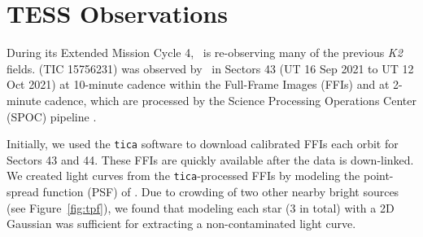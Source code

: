 \documentclass[twocolumn]{aastex631}
\begin{document}
\section{TESS Observations} \label{sec:observations}

During its Extended Mission Cycle 4, \tess\ is re-observing many of the previous \textit{K2} fields. \sname (TIC 15756231) was observed by \tess\ in Sectors 43 (UT 16 Sep 2021 to UT 12 Oct 2021) at 10-minute cadence within the Full-Frame Images (FFIs) and at 2-minute cadence, which are processed by the Science Processing Operations Center (SPOC) pipeline \citep{jenkinsSPOC2016}. 

Initially, we used the \texttt{tica} \citep{fausnaugh20} software to download calibrated FFIs each orbit for Sectors 43 and 44. These FFIs are quickly available after the data is down-linked. We created light curves from the \texttt{tica}-processed FFIs by modeling the point-spread function (PSF) of \sname. Due to crowding of two other nearby bright sources (see Figure~\ref{fig:tpf}), we found that modeling each star (3 in total) with a 2D Gaussian was sufficient for extracting a non-contaminated light curve. %

\end{document}
